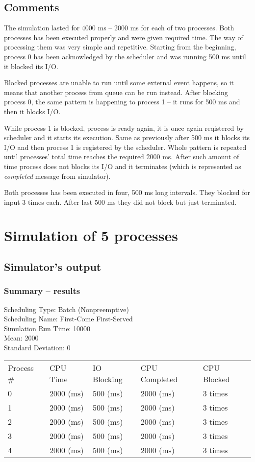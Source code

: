 \documentclass{article}
\begin{document}
\rmfamily

\subsection{Comments}
The simulation lasted for 4000 ms -- 2000 ms for each of two processes. Both processes
has been executed properly and were given required time. The way of processing them
was very simple and repetitive. Starting from the beginning, process 0 has been acknowledged
by the scheduler and was running 500 ms until it blocked its I/O.

Blocked processes are unable to run until some external event happens, so it means that
another process from queue can be run instead. After blocking process 0, the same pattern
is happening to process 1 -- it runs for 500 ms and then it blocks I/O.

While process 1 is blocked, process is ready again, it is once again reqistered by scheduler
and it starts its execution. Same as previously after 500 ms it blocks its I/O and then
process 1 is registered by the scheduler. Whole pattern is repeated until processes'
total time reaches the required 2000 ms. After such amount of time process does not
blocks its I/O and it terminates (which is represented as \emph{completed} message from
simulator).

Both processes has been executed in four, 500 ms long intervals. They blocked for input
3 times each. After last 500 ms they did not block but just terminated.

\section{Simulation of 5 processes}
\subsection{Simulator's output}
\subsubsection*{Summary -- results}
\ttfamily
Scheduling Type: Batch (Nonpreemptive)\\
Scheduling Name: First-Come First-Served\\
Simulation Run Time: 10000\\
Mean: 2000\\
Standard Deviation: 0\\
\begin{tabular}{@{}l l l l l}
    Process \#&	CPU Time&	IO Blocking&	CPU Completed&	CPU Blocked\\
    0		&2000 (ms)	&500 (ms)	&2000 (ms)	&3 times\\
    1		&2000 (ms)	&500 (ms)	&2000 (ms)	&3 times\\
    2		&2000 (ms)	&500 (ms)	&2000 (ms)	&3 times\\
    3		&2000 (ms)	&500 (ms)	&2000 (ms)	&3 times\\
    4		&2000 (ms)	&500 (ms)	&2000 (ms)	&3 times
\end{tabular}
\end{document}
